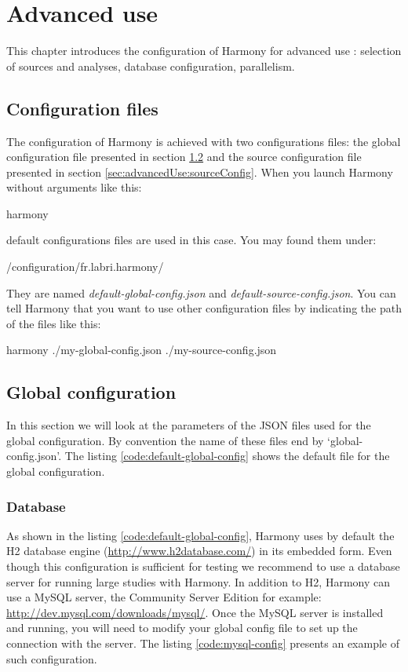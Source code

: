\chapter{Advanced use}

This chapter introduces the configuration of Harmony for advanced use : selection of sources and analyses, database configuration, parallelism.

	\section{Configuration files}
The configuration of Harmony is achieved with two configurations files: the global configuration file presented in section \ref{sec:advancedUse:globalConfig} and the source configuration file presented in section \ref{sec:advancedUse:sourceConfig}. When you launch Harmony without arguments like this:	

\begin{unixcom}
  harmony
\end{unixcom}

default configurations files are used in this case. You may found them under:
\begin{unixcom}
	 /configuration/fr.labri.harmony/  
\end{unixcom}
They are named \emph{default-global-config.json} and \emph{default-source-config.json}. You can tell Harmony that you want to use other configuration files by indicating the path of the files like this:

\begin{unixcom}
  harmony ./my-global-config.json ./my-source-config.json
\end{unixcom}

	\section{Global configuration}\label{sec:advancedUse:globalConfig}
In this section we will look at the parameters of the JSON files used for the global configuration. By convention the name of these files end by `global-config.json'. The listing \ref{code:default-global-config} shows the default file for the global configuration.



		\subsection{Database}
		As shown in the listing \ref{code:default-global-config}, Harmony uses by default the H2 database engine (\url{http://www.h2database.com/}) in its embedded form. Even though this configuration is sufficient for testing we recommend to use a database server for running large studies with Harmony. In addition to H2, Harmony can use a MySQL server, the Community Server Edition for example: \url{http://dev.mysql.com/downloads/mysql/}. Once the MySQL server is installed and running, you will need to modify your global config file to set up the connection with the server. The listing \ref{code:mysql-config} presents an example of such configuration.
		

